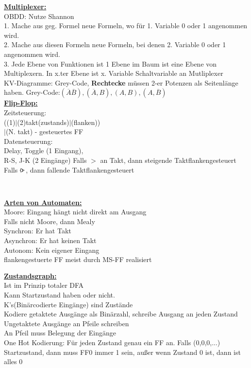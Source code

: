 \documentclass[11pt]{article}
\begin{document}
\begin{minipage}{0.33\textwidth}

\underline{\textbf{Multiplexer:}}\\
OBDD: Nutze Shannon\\
1. Mache aus geg. Formel neue Formeln, wo für 1. Variable 0 oder 1 angenommen wird.\\
2. Mache aus diesen Formeln neue Formeln, bei denen 2. Variable 0 oder 1 angenommen wird.\\
3. Jede Ebene von Funktionen ist 1 Ebene im Baum ist eine Ebene von Multiplexern. In x.ter Ebene ist x. Variable Schaltvariable an Mutliplexer\\
KV-Diagramme: Grey-Code, \textbf{Rechtecke} müssen 2-er Potenzen als Seitenlänge haben.
Grey-Code:$(\overline{A} \overline{B}), (\overline{A}, B), (A,B), (A, \overline{B})$\\

\underline{\textbf{Flip-Flop:}}\\
Zeitsteuerung:\\ ((1)$|$(2)takt(zustands)$|$(flanken))\\$|$(N. takt) - gesteuertes FF\\
Datensteuerung:\\ Delay, Toggle (1 Eingang), \\R-S, J-K (2 Eingänge)
Falls $>$ an Takt, dann steigende Taktflankengesteuert\\
Falls $\rlap{o}{>}$, dann fallende Taktflankengesteuert\\
\end{minipage}
~~~~~~~
\begin{minipage}{0.33\textwidth}
\underline{\textbf{Arten von Automaten:}}\\
Moore: Eingang hängt nicht direkt am Ausgang\\
Falls nicht Moore, dann Mealy\\
Synchron: Er hat Takt\\
Asynchron: Er hat keinen Takt\\
Autonom: Kein eigener Eingang\\
flankengestuerte FF meist durch MS-FF realisiert

\underline{\textbf{Zustandsgraph:}}\\
Ist im Prinzip totaler DFA\\
Kann Startzustand haben oder nicht.\\
K's(Binärcodierte Eingänge) sind Zustände\\
Kodiere getaktete Ausgänge als Binärzahl, schreibe Ausgang an jeden Zustand\\
Ungetaktete Ausgänge an Pfeile schreiben\\
An Pfeil muss Belegung der Eingänge\\
One Hot Kodierung:
Für jeden Zustand genau ein FF an. Falls (0,0,0,...) Startzustand, dann muss FF0 immer 1 sein, außer wenn Zustand 0 ist, dann ist alles 0
\end{minipage}%

\end{document}
